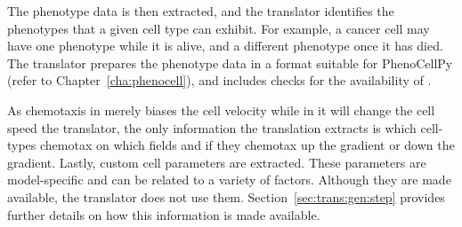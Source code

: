 

The phenotype data is then extracted, and the translator identifies the phenotypes that a given cell type can exhibit. For example, a cancer cell may have one phenotype while it is alive, and a different phenotype once it has died. The translator prepares the phenotype data in a format suitable for PhenoCellPy (refer to Chapter~\ref{cha:phenocell}), and includes checks for the availability of \pcp.


 As chemotaxis in \pscs merely biases the cell velocity while in \ccds it will change the cell speed the translator, the only information the translation extracts is which cell-types chemotax on which fields and if they chemotax up the gradient or down the gradient.
Lastly, custom cell parameters are extracted. These parameters are model-specific and can be related to a variety of factors. Although they are made available,  the translator does not use them. Section~\ref{sec:trans:gen:step} provides further details on how this information is made available.

